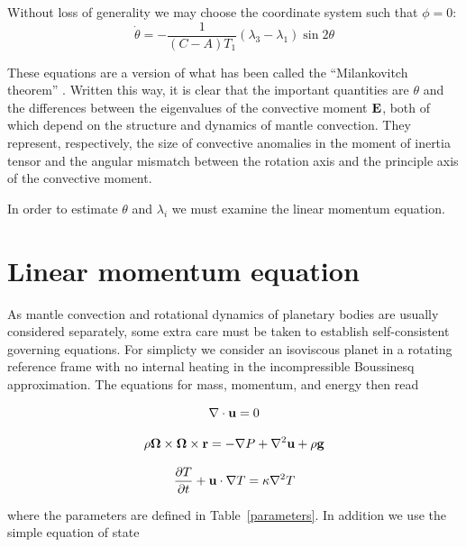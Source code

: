 \documentclass[extra,mreferee]{gji}
\begin{document}
Without loss of generality we may choose the coordinate system such that $\phi=0$:
\begin{equation}
\dot{\theta} = - \frac{1}{(C-A)T_1} (\lambda_3-\lambda_1) \sin{2 \theta}
\label{simple_milankovitch}
\end{equation}

These equations are a version of what has been called the ``Milankovitch theorem'' \citep{munk1960rotation}.  
Written this way, it is clear that the important quantities are $\theta$ and the differences between the eigenvalues of the convective moment $\bf E$, both of which depend on the structure and dynamics of mantle convection.  
They represent, respectively, the size of convective anomalies in the moment of inertia tensor and the angular mismatch between the rotation axis and the principle axis of the convective moment.

In order to estimate $\theta$ and $\lambda_i$ we must examine the linear momentum equation.


\section{Linear momentum equation}
\label{sec:linear}

As mantle convection and rotational dynamics of planetary bodies are usually considered separately, some extra care must be taken to establish self-consistent governing equations.  
For simplicty we consider an isoviscous planet in a rotating reference frame with no internal heating in the incompressible Boussinesq approximation.  The equations for mass, momentum, and energy then read

\begin{equation}
\nabla \cdot {\bf u} = 0
\label{conserve_mass}
\end{equation}

\begin{equation}
\begin{aligned}
 \rho{\bf \Omega \times \Omega \times r}= - \nabla P + \nabla^2 {\bf u} + \rho {\bf g}
\label{navier_stokes}
\end{aligned}
\end{equation}

\begin{equation}
\frac{\partial T}{\partial t} + {\bf u} \cdot \nabla T = \kappa \nabla^2 T
\label{energy}
\end{equation}

where the parameters are defined in Table~\ref{parameters}.
In addition we use the simple equation of state
\end{document}
